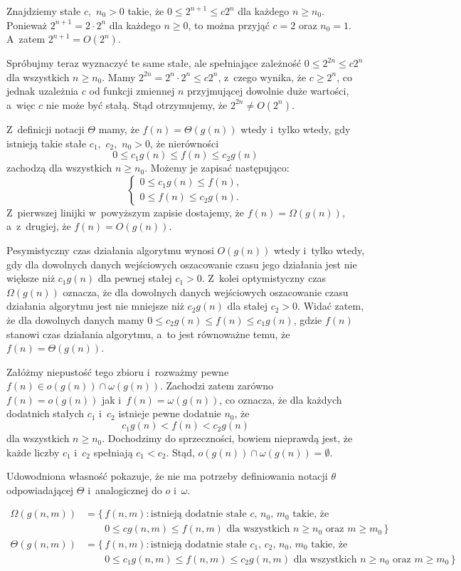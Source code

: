 \exercise %
Znajdziemy stałe $c$,~$n_0>0$ takie, że $0\le2^{n+1}\le c2^n$ dla każdego $n\ge n_0$. Ponieważ $2^{n+1}=2\cdot2^n$ dla każdego $n\ge0$, to można przyjąć $c=2$ oraz $n_0=1$. A~zatem $2^{n+1}=O(2^n)$.

Spróbujmy teraz wyznaczyć te same stałe, ale spełniające zależność $0\le2^{2n}\le c2^n$ dla wszystkich $n\ge n_0$. Mamy $2^{2n}=2^n\cdot2^n\le c2^n$, z~czego wynika, że $c\ge2^n$, co jednak uzależnia $c$ od funkcji zmiennej $n$ przyjmującej dowolnie duże wartości, a~więc $c$ nie może być stałą. Stąd otrzymujemy, że $2^{2n}\ne O(2^n)$.

\exercise %
Z~definicji notacji $\Theta$ mamy, że $f(n)=\Theta(g(n))$ wtedy i~tylko wtedy, gdy istnieją takie stałe $c_1$,~$c_2$,~$n_0>0$, że nierówności
\[
	0 \le c_1g(n) \le f(n) \le c_2g(n)
\]
zachodzą dla wszystkich $n\ge n_0$. Możemy je zapisać następująco:
\[
	\begin{cases}
		0 \le c_1g(n) \le f(n), \\
		0 \le f(n) \le c_2g(n).
	\end{cases}
\]
Z~pierwszej linijki w~powyższym zapisie dostajemy, że $f(n)=\Omega(g(n))$, a~z~drugiej, że $f(n)=O(g(n))$.

\exercise %
Pesymistyczny czas działania algorytmu wynosi $O(g(n))$ wtedy i~tylko wtedy, gdy dla dowolnych danych wejściowych oszacowanie czasu jego działania jest nie większe niż $c_1g(n)$ dla pewnej stałej $c_1>0$. Z~kolei optymistyczny czas $\Omega(g(n))$ oznacza, że dla dowolnych danych wejściowych oszacowanie czasu działania algorytmu jest nie mniejsze niż $c_2g(n)$ dla stałej $c_2>0$. Widać zatem, że dla dowolnych danych mamy $0\le c_2g(n)\le f(n)\le c_1g(n)$, gdzie $f(n)$ stanowi czas działania algorytmu, a~to jest równoważne temu, że $f(n)=\Theta(g(n))$.

\exercise %
Załóżmy niepustość tego zbioru i~rozważmy pewne $f(n)\in o(g(n))\cap\omega(g(n))$. Zachodzi zatem zarówno $f(n)=o(g(n))$ jak i~$f(n)=\omega(g(n))$, co oznacza, że dla każdych dodatnich stałych $c_1$ i~$c_2$ istnieje pewne dodatnie $n_0$, że
\[
	c_1g(n) < f(n) < c_2g(n)
\]
dla wszystkich $n\ge n_0$. Dochodzimy do sprzeczności, bowiem nieprawdą jest, że każde liczby $c_1$ i~$c_2$ spełniają $c_1<c_2$. Stąd, $o(g(n))\cap\omega(g(n))=\emptyset$.

Udowodniona własność pokazuje, że nie ma potrzeby definiowania notacji $\theta$ odpowiadającej $\Theta$ i~analogicznej do $o$ i~$\omega$.

\exercise %
\[
	\begin{split}
		\Omega(g(n,m)) &= \bigl\{\,f(n,m):\text{istnieją dodatnie stałe $c$,~$n_0$,~$m_0$ takie, że} \\
		&\qquad 0 \le cg(n,m) \le f(n,m) \text{ dla wszystkich $n \ge n_0$ oraz $m \ge m_0$}\,\bigr\} \\[3mm]
		\Theta(g(n,m)) &= \bigl\{\,f(n,m):\text{istnieją dodatnie stałe $c_1$,~$c_2$,~$n_0$,~$m_0$ takie, że} \\
		&\qquad 0 \le c_1g(n,m) \le f(n,m) \le c_2g(n,m) \text{ dla wszystkich $n \ge n_0$ oraz $m \ge m_0$}\,\bigr\}
	\end{split}
\]

